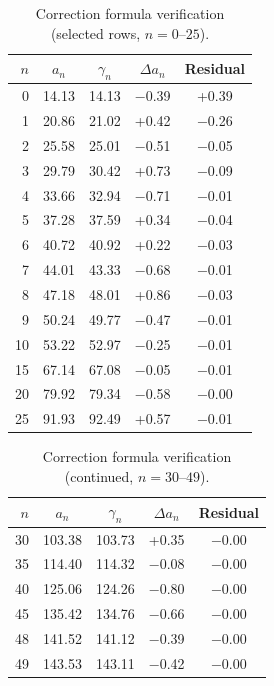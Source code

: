 \documentclass{pre-aomart}
\theoremstyle{plain}
\theoremstyle{definition}
\theoremstyle{remark}
\begin{document}
\begin{table}[htbp]
\centering
\small
\caption{Correction formula verification (selected rows, $n=0$--$25$).}
\label{tab:correction}
\begin{tabular}{rcccc}
\toprule
$n$ & $a_n$ & $\gamma_n$ & $\Delta a_n$ & Residual \\
\midrule
  0 & 14.13 & 14.13 & $-$0.39 & +0.39 \\
  1 & 20.86 & 21.02 & +0.42 & $-$0.26 \\
  2 & 25.58 & 25.01 & $-$0.51 & $-$0.05 \\
  3 & 29.79 & 30.42 & +0.73 & $-$0.09 \\
  4 & 33.66 & 32.94 & $-$0.71 & $-$0.01 \\
  5 & 37.28 & 37.59 & +0.34 & $-$0.04 \\
  6 & 40.72 & 40.92 & +0.22 & $-$0.03 \\
  7 & 44.01 & 43.33 & $-$0.68 & $-$0.01 \\
  8 & 47.18 & 48.01 & +0.86 & $-$0.03 \\
  9 & 50.24 & 49.77 & $-$0.47 & $-$0.01 \\
 10 & 53.22 & 52.97 & $-$0.25 & $-$0.01 \\
 15 & 67.14 & 67.08 & $-$0.05 & $-$0.01 \\
 20 & 79.92 & 79.34 & $-$0.58 & $-$0.00 \\
 25 & 91.93 & 92.49 & +0.57 & $-$0.01 \\
\bottomrule
\end{tabular}
\end{table}

\begin{table}[htbp]
\centering
\small
\caption{Correction formula verification (continued, $n=30$--$49$).}
\label{tab:correction2}
\begin{tabular}{rcccc}
\toprule
$n$ & $a_n$ & $\gamma_n$ & $\Delta a_n$ & Residual \\
\midrule
 30 & 103.38 & 103.73 & +0.35 & $-$0.00 \\
 35 & 114.40 & 114.32 & $-$0.08 & $-$0.00 \\
 40 & 125.06 & 124.26 & $-$0.80 & $-$0.00 \\
 45 & 135.42 & 134.76 & $-$0.66 & $-$0.00 \\
 48 & 141.52 & 141.12 & $-$0.39 & $-$0.00 \\
 49 & 143.53 & 143.11 & $-$0.42 & $-$0.00 \\
\bottomrule
\end{tabular}
\end{table}
\end{document}
